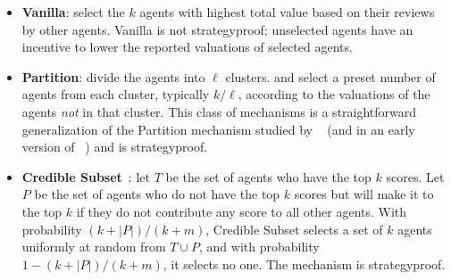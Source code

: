 \documentclass[letterpaper]{article}
\newcommand{\citet}[1]{\citeauthor{#1}~\shortcite{#1}}
\newcommand{\citep}{\cite}
\begin{document}
\begin{itemize}[leftmargin=*]
\item \textbf{Vanilla}: %
select the $k$ agents with highest total value based on their reviews by other agents.
Vanilla is not strategyproof; unselected agents have an incentive to lower the reported valuations of selected agents.
\item \textbf{Partition}: divide the agents into ${\ell}$ clusters. and select a preset number of agents from each cluster, typically $k/\ell$, according to the valuations of the agents \emph{not} in that cluster. This class of mechanisms is a straightforward generalization of the Partition mechanism studied by \citet{AFPT11a} (and in an early version of \citet{KLMP15b}) and is strategyproof.
\item \textbf{Credible Subset}~\citep{KLMP15b}:
let $T$ be the set of agents who have the top $k$ scores.
Let $P$ be the set of agents who do not have the top $k$ scores but will make it to the top $k$ if they do not contribute any score to all other agents.
With probability $(k+|P|)/(k+m)$, Credible Subset selects a set of $k$ agents uniformly at random from $T\cup P$, and with probability $1-(k+|P|)/(k+m)$, it selects no one. The mechanism is strategyproof. %



\end{itemize}
\end{document}

